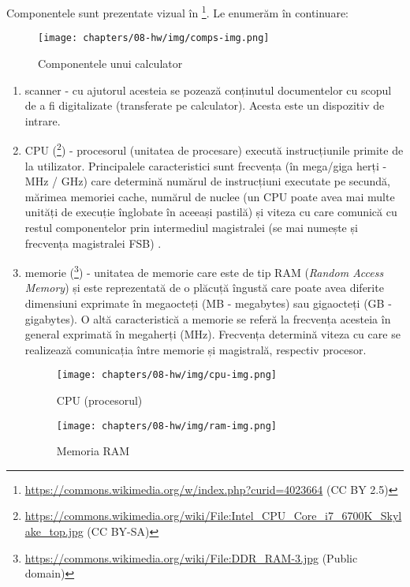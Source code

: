 Componentele sunt prezentate vizual în \footnote{\url{https://commons.wikimedia.org/w/index.php?curid=4023664} (CC BY 2.5)}.
Le enumerăm în continuare:

\begin{figure}[!htbp]
  \centering
  \texttt{[image: chapters/08-hw/img/comps-img.png]}
  \caption{Componentele unui calculator}
  \label{fig:hw:components}
\end{figure}

\begin{enumerate}
  \item scanner - cu ajutorul acesteia se pozează conținutul documentelor cu scopul de a fi digitalizate (transferate pe calculator).
    Acesta este un dispozitiv de intrare.
  \item CPU (\footnote{\url{https://commons.wikimedia.org/wiki/File:Intel_CPU_Core_i7_6700K_Skylake_top.jpg} (CC BY-SA)}) - procesorul (unitatea de procesare) execută instrucțiunile primite de la utilizator.
    Principalele caracteristici sunt frecvența (în mega/giga herți - MHz / GHz) care determină numărul de instrucțiuni executate pe secundă, mărimea memoriei cache, numărul de nuclee (un CPU poate avea mai multe unități de execuție înglobate în aceeași pastilă) și viteza cu care comunică cu restul componentelor prin intermediul magistralei (se mai numește și frecvența magistralei FSB) .
  \item memorie (\footnote{\url{https://commons.wikimedia.org/wiki/File:DDR_RAM-3.jpg} (Public domain)}) - unitatea de memorie care este de tip RAM  (\textit{Random Access Memory}) și este reprezentată de o plăcuță îngustă care poate avea diferite dimensiuni exprimate în megaocteți (MB - megabytes) sau gigaocteți (GB - gigabytes).
    O altă caracteristică a memorie se referă la frecvența acesteia în general exprimată în megaherți (MHz).
    Frecvența determină viteza cu care se realizează comunicația între memorie și magistrală, respectiv procesor.

\begin{figure}[!htbp]
  \centering
  \texttt{[image: chapters/08-hw/img/cpu-img.png]}
  \caption{CPU (procesorul)}
  \label{fig:hw:cpu}
\end{figure}

\begin{figure}[!htbp]
  \centering
  \texttt{[image: chapters/08-hw/img/ram-img.png]}
  \caption{Memoria RAM}
  \label{fig:hw:ram}
\end{figure}


\end{enumerate}
